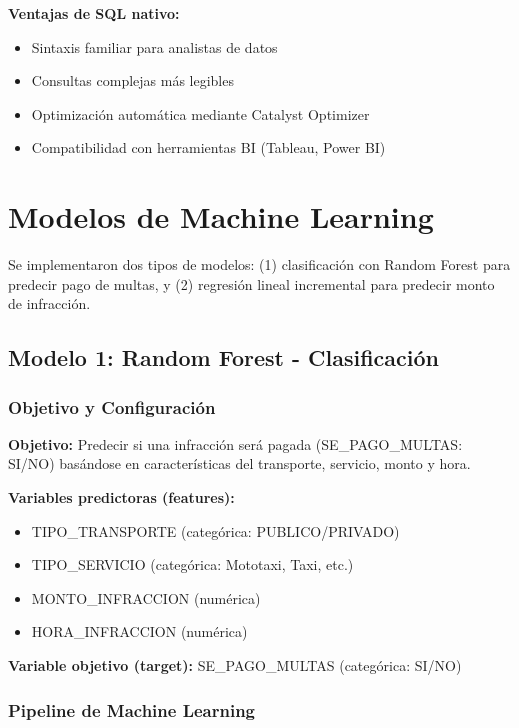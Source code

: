 \documentclass[12pt,a4paper]{article}
\begin{document}
\textbf{Ventajas de SQL nativo:}
\begin{itemize}
    \item Sintaxis familiar para analistas de datos
    \item Consultas complejas más legibles
    \item Optimización automática mediante Catalyst Optimizer
    \item Compatibilidad con herramientas BI (Tableau, Power BI)
\end{itemize}

\section{Modelos de Machine Learning}

Se implementaron dos tipos de modelos: (1) clasificación con Random Forest para predecir pago de multas, y (2) regresión lineal incremental para predecir monto de infracción.

\subsection{Modelo 1: Random Forest - Clasificación}

\subsubsection{Objetivo y Configuración}

\textbf{Objetivo:} Predecir si una infracción será pagada (SE\_PAGO\_MULTAS: SI/NO) basándose en características del transporte, servicio, monto y hora.

\textbf{Variables predictoras (features):}
\begin{itemize}
    \item TIPO\_TRANSPORTE (categórica: PUBLICO/PRIVADO)
    \item TIPO\_SERVICIO (categórica: Mototaxi, Taxi, etc.)
    \item MONTO\_INFRACCION (numérica)
    \item HORA\_INFRACCION (numérica)
\end{itemize}

\textbf{Variable objetivo (target):} SE\_PAGO\_MULTAS (categórica: SI/NO)

\subsubsection{Pipeline de Machine Learning}
\end{document}

